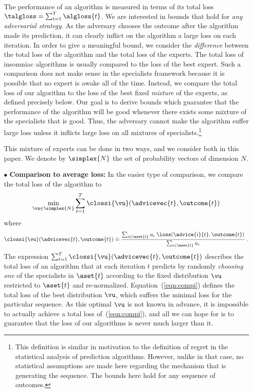The performance of an algorithm is measured in terms of its total loss
$\talgloss = \sum_{t=1}^T \algloss{t}$.
We are interested in bounds that hold for {\em any adversarial strategy}.
As the adversary chooses the outcome after the algorithm made its
prediction, it can clearly inflict on the algorithm a large loss on
each iteration. 
In order to give a meaningful bound, we consider the {\em difference}
between the total loss of the algorithm and the total loss of the
experts.
The total loss of insomniac algorithms is usually compared to the loss
of the best expert. Such a comparison does not make sense in the
specialists framework because it is possible that no expert is awake
all of the time. Instead, we compare the
total loss of our algorithm to the loss
of the best fixed {\em mixture\/} of the experts, as defined precisely below.
Our goal is to derive bounds which guarantee that the
performance of the algorithm will be good whenever there exists some mixture
of the specialists that is good. Thus, the adversary cannot
make the algorithm suffer large loss unless it inflicts large loss on 
all mixtures of specialists.\footnote{This definition is
similar in motivation to the definition of regret in the statistical
analysis of prediction algorithms. However, unlike in that case, no
statistical assumptions are made here regarding the mechanism that is
generating the sequence. The bounds here hold for any sequence of
outcomes.}

This mixture of experts can be done in two ways, and we consider both
in this paper. We denote by $\simplex{N}$ the set of probability
vectors of dimension $N$.

$\bullet$ {\bf Comparison to average loss:}
In the easier type of comparison, we compare the total loss of the
algorithm to
\begin{equation} \label{eqn:compi}
\min_{\vu \in \simplex{N}} \sum_{t=1}^T 
\clossi{\vu}(\advicevec{t},\outcome{t}) 
\end{equation}
where
\[
\clossi{\vu}(\advicevec{t},\outcome{t}) \doteq
{\sum_{i \in \aset{t}} u_i \; \loss(\advice{i}{t},\outcome{t})
 \over
 \sum_{i \in \aset{t}} u_i}~.
\]
The expression $\sum_{t=1}^T \clossi{\vu}(\advicevec{t},\outcome{t})$
describes the total loss of an algorithm
that at each iteration $t$ predicts by randomly {\em choosing one} of the
specialists in $\aset{t}$ according to the fixed distribution $\vu$
restricted to $\aset{t}$ and re-normalized.
Equation~(\ref{eqn:compi}) defines the total loss of the best
distribution $\vu$, which suffers the minimal loss for the particular
sequence. As this optimal $\vu$ is not known in advance, it is
impossible to actually achieve a total loss of~(\ref{eqn:compi}), and
all we can hope for is to guarantee that the loss of our algorithms is
never much larger than it.

